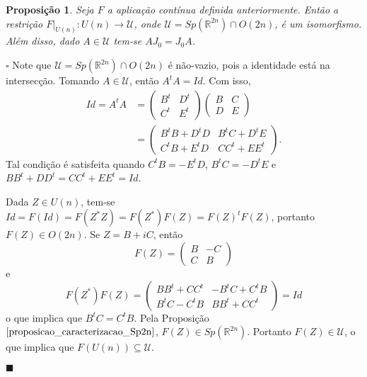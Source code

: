 \documentclass[12pt]{book}
\newtheorem{proposicao}[teorema]{Proposição}
\newenvironment{prova}[1]{$\square$ #1}{\hfill$\blacksquare$}
\newcommand{\estruturacomplexa}{J_{0}}
\newcommand{\gruposimpletico}[1]{Sp(#1)}
\newcommand{\matrizortogonal}[1]{O(#1)}
\newcommand{\matrizSimpleticaOrtogonal}{\mathcal{U}}
\newcommand{\matrizunitaria}[1]{U(#1)}
\newcommand{\real}[1]{\mathbb{R}^{#1}}
\begin{document}
	\begin{proposicao}\label{proposicao_isomorfismo_U}
		Seja $F$ a aplicação contínua definida anteriormente. Então a restrição $F|_{\matrizunitaria{n}}: \matrizunitaria{n} \to \matrizSimpleticaOrtogonal $, onde $\matrizSimpleticaOrtogonal  = \gruposimpletico{\real{2n}}\cap \matrizortogonal{2n}$, é um isomorfismo. Além disso, dado $A \in \matrizSimpleticaOrtogonal $ tem-se $A\estruturacomplexa=\estruturacomplexa A$.
	\end{proposicao}
	\begin{prova}
		Note que $\matrizSimpleticaOrtogonal  = \gruposimpletico{\real{2n}} \cap \matrizortogonal{2n}$ é não-vazio, pois a identidade está na intersecção. Tomando $A \in \matrizSimpleticaOrtogonal $, então $A^{t}A= Id$. Com isso,
		$$
		\begin{aligned}
		Id=A^{t}A &=
		\left(
		\begin{array}{cc}
		B^{t} & D^{t}
		\\
		C^{t} & E^{t}
		\end{array}
		\right)
		\left(
		\begin{array}{cc}
		B & C
		\\
		D & E
		\end{array}
		\right)
		\\
		&= 
		\left(
		\begin{array}{cc}
		B^{t}B + D^{t}D & B^{t}C + D^{t}E 
		\\
		C^{t}B + E^{t}D  & CC^{t}+EE^{t}
		\end{array}
		\right).
		\end{aligned}
		$$
		Tal condição é satisfeita quando $C^{t}B =- E^{t}D$, $B^{t}C =- D^{t}E$ e $BB^{t} + DD^{t} = CC^{t}+EE^{t} = Id$. 
		
		Dada $Z \in \matrizunitaria{n}$, tem-se $Id=F(Id) = F(Z^{*}Z) = F(Z^{*})F(Z) = F(Z)^{t}F(Z)$, portanto $F(Z) \in \matrizortogonal{2n}$. Se $Z= B+iC$, então
		$$
		F(Z)=
		\left(
		\begin{array}{cc}
		B & -C
		\\
		C & B
		\end{array}
		\right)
		$$
		e
		$$
		F(Z^{*})F(Z)=
		\left(
		\begin{array}{cc}
		BB^{t} +CC^{t} & -B^{t}C +C^{t}B
		\\
		B^{t}C -C^{t}B & BB^{t} +CC^{t}
		\end{array}
		\right)	
		= Id
		$$
		o que implica que $B^{t}C =C^{t}B$. Pela Proposição $\ref{proposicao_caracterizacao_Sp2n}$, $F(Z) \in \gruposimpletico{\real{2n}}$. Portanto $F(Z) \in \matrizSimpleticaOrtogonal $, o que implica que $F(\matrizunitaria{n}) \subseteq \matrizSimpleticaOrtogonal$.
		

\end{prova}
\end{document}
